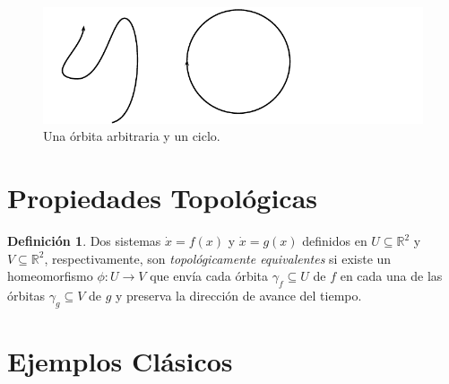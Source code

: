 \documentclass[11pt]{book}
\theoremstyle{definition}
\newtheorem{definition}{Definición}
\numberwithin{definition}{section}
\theoremstyle{theorem}
\numberwithin{theorem}{section}
\numberwithin{lemma}{section}
\numberwithin{corollary}{section}
\theoremstyle{plain}
\numberwithin{example}{section}
\newcommand{\R}{{\ensuremath{\mathbb{R}}}}
\begin{document}
\begin{figure}[!ht] \centering
	\includegraphics[scale=1.1]{figures/orbita-tipos.pdf}
	\caption{Una órbita arbitraria y un ciclo.}
\end{figure}

\section{Propiedades Topológicas}

\begin{definition}Dos sistemas $\dot{x} = f(x)$ y $\dot{x} = g(x)$ definidos en $U \subseteq \R^2$ y $V \subseteq \R^2$, respectivamente, son \emph{topológicamente equivalentes} si existe un homeomorfismo $\phi : U \to V$ que envía cada órbita $\gamma_f \subseteq U$ de $f$ en cada una de las órbitas $\gamma_g \subseteq V$ de $g$ y preserva la dirección de avance del tiempo.
\end{definition}


\section{Ejemplos Clásicos}
\end{document}
